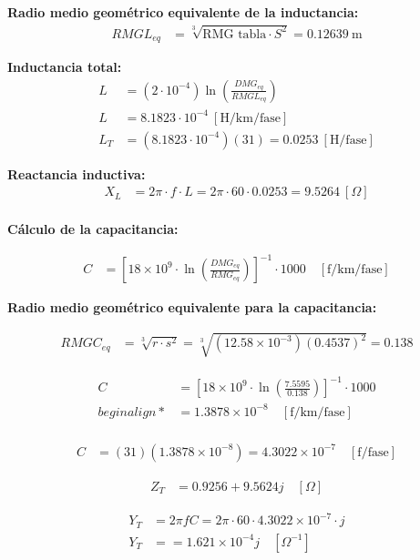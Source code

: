 \textbf{Radio medio geométrico equivalente de la inductancia:}
\begin{align*}
RMGL_{eq} &= \sqrt[3]{\text{RMG tabla} \cdot S^2} = 0.12639~\text{m}
\end{align*}

\textbf{Inductancia total:}
\begin{align*}
L &= \left(2 \cdot 10^{-4} \right) \ln \left( \frac{DMG_{eq}}{RMGL_{eq}} \right) \\
L &= 8.1823 \cdot 10^{-4}~[\text{H/km/fase}] \\
L_T &= (8.1823 \cdot 10^{-4})(31) = 0.0253~[\text{H/fase}]
\end{align*}

\textbf{Reactancia inductiva:}
\begin{align*}
X_L &= 2\pi \cdot f \cdot L = 2\pi \cdot 60 \cdot 0.0253 = 9.5264~[\Omega] \\
\end{align*}

\textbf{Cálculo de la capacitancia:}

\begin{align*}
C &= \left[ 18 \times 10^9 \cdot \ln \left( \frac{DMG_{eq}}{RMG_{eq}} \right) \right]^{-1} \cdot 1000 \quad [\text{f/km/fase}]
\end{align*}

\textbf{Radio medio geométrico equivalente para la capacitancia:}

\begin{align*}
RMGC_{eq} &= \sqrt[3]{r \cdot s^2} = \sqrt[3]{(12.58 \times 10^{-3})(0.4537)^2} = 0.138
\end{align*}

\begin{align*}
C &= \left[ 18 \times 10^9 \cdot \ln\left( \frac{7.5595}{0.138} \right) \right]^{-1} \cdot 1000 \\begin{align*}
&= 1.3878 \times 10^{-8} \quad [\text{f/km/fase}] \\
\end{align*}

\begin{align*}
C &= (31)(1.3878 \times 10^{-8}) = 4.3022 \times 10^{-7} \quad [\text{f/fase}]
\end{align*}

\begin{align*}
Z_T &= 0.9256 + 9.5624j \quad [\Omega]
\end{align*}

\begin{align*}
Y_T &= 2 \pi f C = 2 \pi \cdot 60 \cdot 4.3022 \times 10^{-7} \cdot j \\
Y_T &= = 1.621 \times 10^{-4} j \quad [\Omega^{-1}]
\end{align*}

